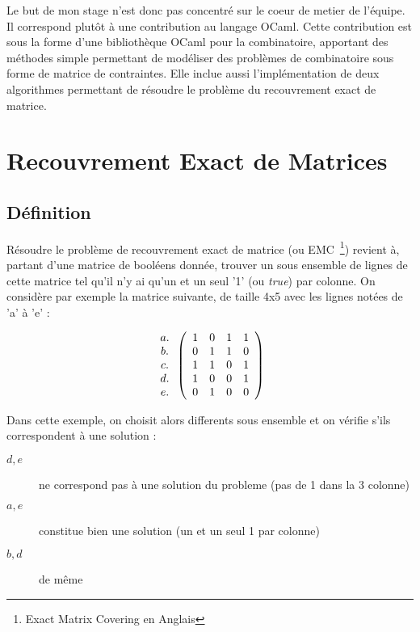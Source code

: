 \documentclass[a4paper]{article}
\begin{document}
Le but de mon stage n'est donc pas concentré sur le coeur de metier de 
l'équipe. Il correspond plutôt à une contribution au langage OCaml. 
Cette contribution
est sous la forme d'une bibliothèque OCaml pour la combinatoire, apportant
des méthodes simple permettant de modéliser des problèmes de combinatoire
sous forme de matrice de contraintes. Elle inclue aussi l'implémentation de 
deux algorithmes permettant de résoudre le problème du recouvrement exact de
matrice.


\section{Recouvrement Exact de Matrices}

\subsection{Définition}

Résoudre le problème de recouvrement exact de matrice 
(ou EMC~\footnote{Exact Matrix Covering en Anglais}) revient à,
partant d'une matrice de booléens donnée, trouver un sous ensemble de 
lignes de cette matrice tel qu'il n'y ai qu'un et un seul '1' (ou \emph{true}) 
par colonne.
On considère par exemple la matrice suivante, de taille 4x5 avec les lignes
notées de 'a' à 'e' : 

\[
  \begin{array}{ c }
   a. \\
   b. \\
   c. \\
   d. \\
   e. \\
  \end{array}
\left(
  \begin{array}{ c c c c c }
   1 & 0 & 1 & 1 \\
   0 & 1 & 1 & 0 \\
   1 & 1 & 0 & 1 \\
   1 & 0 & 0 & 1 \\
   0 & 1 & 0 & 0
  \end{array} \right)
\]

Dans cette exemple, on choisit alors differents sous ensemble et on vérifie 
s'ils correspondent à une solution :

\begin{description}
\item[$ {d, e} $] ne correspond pas à une solution du probleme (pas de 1 dans la 3 colonne)
\item[$ {a, e} $] constitue bien une solution (un et un seul 1 par colonne)
\item[$ {b, d} $] de même
\end{description}
\end{document}
